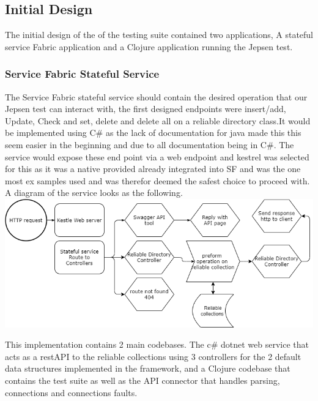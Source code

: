 \documentclass[a4paper,10pt,titlepage]{report}
\begin{document}
\subsection{Initial Design}

The initial design of the of the testing suite contained two applications, A stateful service Fabric application and a Clojure application running the Jepsen test.

\subsubsection{Service Fabric Stateful Service}

The Service Fabric stateful service should contain the desired operation that our Jepsen test can interact with, the first designed endpoints were insert/add, Update, Check and set, delete and delete all on a reliable directory class.It would be implemented using C\# as the lack of documentation for java made this this seem easier in the beginning and due to all documentation being in C\#. The service would expose these end point via a web endpoint and kestrel was selected for this as it was a native provided already integrated into SF and was the one most ex samples used and was therefor deemed the safest choice to proceed with.\\
\vspace{5mm}
A diagram of the service looks as the following. \\
\vspace{5mm}
\includegraphics[scale=0.5]{images/Design_Stateful_service_1.0.drawio.png}

This implementation contains 2 main codebases. The c\# dotnet web service that acts as a restAPI to the reliable collections using 3 controllers for the 2 default data structures implemented in the framework, and a Clojure codebase that contains the test suite as well as the API connector that handles parsing, connections and connections faults.
\end{document}
